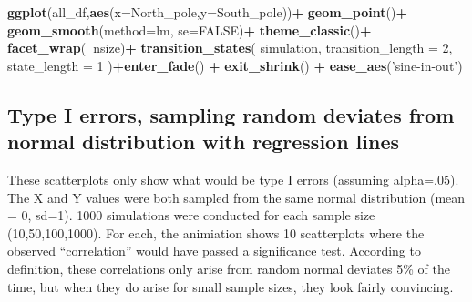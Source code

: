 \documentclass[
]{book}
\newenvironment{Shaded}{\begin{snugshade}}{\end{snugshade}}
\newcommand{\DataTypeTok}[1]{\textcolor[rgb]{0.13,0.29,0.53}{#1}}
\newcommand{\DecValTok}[1]{\textcolor[rgb]{0.00,0.00,0.81}{#1}}
\newcommand{\KeywordTok}[1]{\textcolor[rgb]{0.13,0.29,0.53}{\textbf{#1}}}
\newcommand{\NormalTok}[1]{#1}
\newcommand{\OperatorTok}[1]{\textcolor[rgb]{0.81,0.36,0.00}{\textbf{#1}}}
\newcommand{\OtherTok}[1]{\textcolor[rgb]{0.56,0.35,0.01}{#1}}
\newcommand{\StringTok}[1]{\textcolor[rgb]{0.31,0.60,0.02}{#1}}
\begin{document}
\begin{Shaded}
\begin{Highlighting}[]
\KeywordTok{ggplot}\NormalTok{(all_df,}\KeywordTok{aes}\NormalTok{(}\DataTypeTok{x=}\NormalTok{North_pole,}\DataTypeTok{y=}\NormalTok{South_pole))}\OperatorTok{+}
\StringTok{  }\KeywordTok{geom_point}\NormalTok{()}\OperatorTok{+}
\StringTok{  }\KeywordTok{geom_smooth}\NormalTok{(}\DataTypeTok{method=}\NormalTok{lm, }\DataTypeTok{se=}\OtherTok{FALSE}\NormalTok{)}\OperatorTok{+}
\StringTok{  }\KeywordTok{theme_classic}\NormalTok{()}\OperatorTok{+}
\StringTok{  }\KeywordTok{facet_wrap}\NormalTok{(}\OperatorTok{~}\NormalTok{nsize)}\OperatorTok{+}
\StringTok{  }\KeywordTok{transition_states}\NormalTok{(}
\NormalTok{    simulation,}
    \DataTypeTok{transition_length =} \DecValTok{2}\NormalTok{,}
    \DataTypeTok{state_length =} \DecValTok{1}
\NormalTok{  )}\OperatorTok{+}\KeywordTok{enter_fade}\NormalTok{() }\OperatorTok{+}\StringTok{ }
\StringTok{  }\KeywordTok{exit_shrink}\NormalTok{() }\OperatorTok{+}
\StringTok{  }\KeywordTok{ease_aes}\NormalTok{(}\StringTok{'sine-in-out'}\NormalTok{)}
\end{Highlighting}
\end{Shaded}

\hypertarget{type-i-errors-sampling-random-deviates-from-normal-distribution-with-regression-lines}{%
\subsection{Type I errors, sampling random deviates from normal distribution with regression lines}\label{type-i-errors-sampling-random-deviates-from-normal-distribution-with-regression-lines}}

These scatterplots only show what would be type I errors (assuming alpha=.05). The X and Y values were both sampled from the same normal distribution (mean = 0, sd=1). 1000 simulations were conducted for each sample size (10,50,100,1000). For each, the animiation shows 10 scatterplots where the observed ``correlation'' would have passed a significance test. According to definition, these correlations only arise from random normal deviates 5\% of the time, but when they do arise for small sample sizes, they look fairly convincing.
\end{document}
